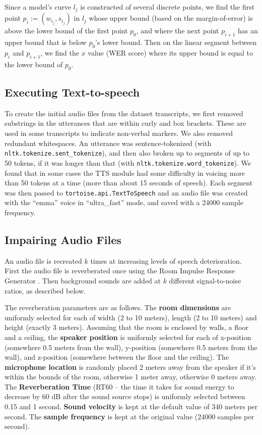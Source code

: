 Since a model's curve $l_j$ is constructed of several discrete points, we find the first point $p_i:=(w_{i_j}, s_{i_j})$ in $l_j$ whose upper bound (based on the margin-of-error) is above the lower bound of the first point $p_0$, and where the next point $p_{i+1}$ has an upper bound that is below $p_0$'s lower bound. Then on the linear segment between $p_i$ and $p_{i+1}$, we find the $x$ value (WER score) where its upper bound is equal to the lower bound of $p_0$.




\subsection{Executing Text-to-speech}
\label{sec_appendix_implementation_tts}

To create the initial audio files from the dataset transcripts, we first removed substrings in the utterances that are within curly and box brackets. These are used in some transcripts to indicate non-verbal markers. We also removed redundant whitespaces. An utterance was sentence-tokenized (with \texttt{nltk.tokenize.sent\_tokenize}), and then also broken up to segments of up to 50 tokens, if it was longer than that (with \texttt{nltk.tokenize.word\_tokenize}). We found that in some cases the TTS module had some difficulty in voicing more than 50 tokens at a time (more than about 15 seconds of speech). Each segment was then passed to \texttt{tortoise.api.TextToSpeech} and an audio file was created with the ``emma'' voice in ``ultra\_fast'' mode, and saved with a 24000 sample frequency.


\subsection{Impairing Audio Files}
\label{sec_appendix_implementation_noising}

An audio file is recreated $k$ times at increasing levels of speech deterioration. First the audio file is reverberated once using the Room Impulse Response Generator \citep[\texttt{rir\_generator} library;][]{werner2023rirgenerator}. Then background sounds are added at $k$ different signal-to-noise ratios, as described below.

The reverberation parameters are as follows. The \textbf{room dimensions} are uniformly selected for each of width (2 to 10 meters), length (2 to 10 meters) and height (exactly 3 meters). Assuming that the room is enclosed by walls, a floor and a ceiling, the \textbf{speaker position} is uniformly selected for each of x-position (somewhere 0.5 meters from the wall), y-position (somewhere 0.5 meters from the wall), and z-position (somewhere between the floor and the ceiling). The \textbf{microphone location} is randomly placed 2 meters away from the speaker if it's within the bounds of the room, otherwise 1 meter away, otherwise 0 meters away. The \textbf{Reverberation Time} (RT60 -- the time it takes for sound energy to decrease by 60 dB after the sound source stops) is uniformly selected between 0.15 and 1 second. \textbf{Sound velocity} is kept at the default value of 340 meters per second. The \textbf{sample frequency} is kept at the original value (24000 samples per second).

